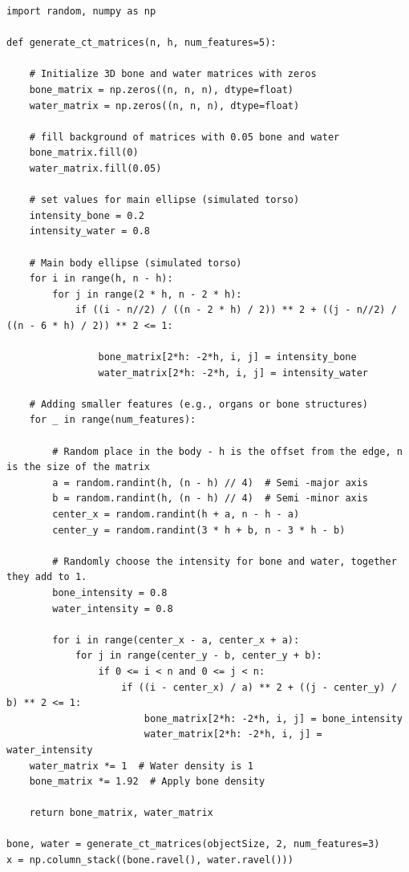 \documentclass{article}
\begin{document}
\begin{verbatim}
import random, numpy as np

def generate_ct_matrices(n, h, num_features=5):

    # Initialize 3D bone and water matrices with zeros
    bone_matrix = np.zeros((n, n, n), dtype=float)
    water_matrix = np.zeros((n, n, n), dtype=float)

    # fill background of matrices with 0.05 bone and water 
    bone_matrix.fill(0)
    water_matrix.fill(0.05)
    
    # set values for main ellipse (simulated torso)
    intensity_bone = 0.2
    intensity_water = 0.8
    
    # Main body ellipse (simulated torso)
    for i in range(h, n - h):
        for j in range(2 * h, n - 2 * h):
            if ((i - n//2) / ((n - 2 * h) / 2)) ** 2 + ((j - n//2) / ((n - 6 * h) / 2)) ** 2 <= 1:
                
                bone_matrix[2*h: -2*h, i, j] = intensity_bone
                water_matrix[2*h: -2*h, i, j] = intensity_water

    # Adding smaller features (e.g., organs or bone structures)
    for _ in range(num_features):
        
        # Random place in the body - h is the offset from the edge, n is the size of the matrix
        a = random.randint(h, (n - h) // 4)  # Semi -major axis
        b = random.randint(h, (n - h) // 4)  # Semi -minor axis
        center_x = random.randint(h + a, n - h - a)
        center_y = random.randint(3 * h + b, n - 3 * h - b)

        # Randomly choose the intensity for bone and water, together they add to 1. 
        bone_intensity = 0.8
        water_intensity = 0.8
        
        for i in range(center_x - a, center_x + a):
            for j in range(center_y - b, center_y + b):
                if 0 <= i < n and 0 <= j < n:
                    if ((i - center_x) / a) ** 2 + ((j - center_y) / b) ** 2 <= 1:
                        bone_matrix[2*h: -2*h, i, j] = bone_intensity
                        water_matrix[2*h: -2*h, i, j] = water_intensity
    water_matrix *= 1  # Water density is 1
    bone_matrix *= 1.92  # Apply bone density
    
    return bone_matrix, water_matrix

bone, water = generate_ct_matrices(objectSize, 2, num_features=3)
x = np.column_stack((bone.ravel(), water.ravel()))
\end{verbatim}
\end{document}
